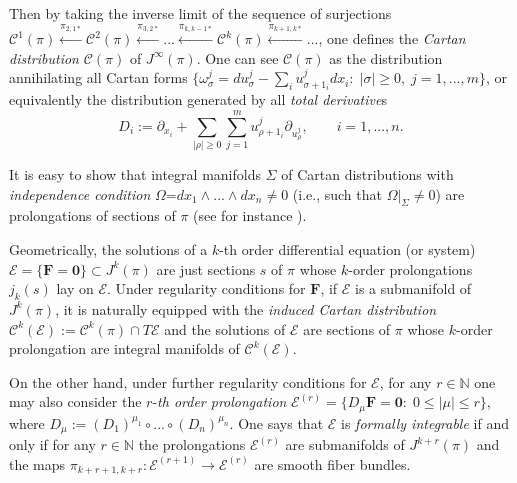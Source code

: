 \documentclass[12pt,english]{elsarticle}
\theoremstyle{plain}
\theoremstyle{plain}
\theoremstyle{remark}
\theoremstyle{plain}
\theoremstyle{definition}
\theoremstyle{definition}
\begin{document}
Then by taking the inverse limit of the sequence of surjections
$\mathcal{C}^{1}(\pi )\overset{\pi _{2,1*}}{\longleftarrow}
\mathcal{C}^{2}(\pi )\overset{\pi _{3,2*}}{\longleftarrow}...
\overset{\pi _{k,k-1*}}{\longleftarrow}\mathcal{C}^{k}(\pi )
\overset{\pi _{k+1,k*}}{\longleftarrow}...$, one defines the
\textit{Cartan distribution} $\mathcal{C}(\pi )$ of
$J^{\infty}(\pi )$. One can see $\mathcal{C}(\pi )$ as the distribution
annihilating all Cartan forms
$\{\omega _{\sigma}^{j}=du_{\sigma}^{j}-\sum _{i}u_{\sigma +1_{i}}^{j}dx_{i}:
\;|\sigma |\geq 0,\;j=1,...,m\}$, or equivalently the distribution generated
by all \textit{total derivative}s
%
\begin{equation*}
D_{i}:=\partial _{x_{i}}+{\displaystyle \sum _{|\rho |\geq 0}\sum _{j=1}^{m}u_{
\rho +1_{i}}^{j}\partial _{u_{\rho}^{j}}},\qquad i=1,...,n.
\end{equation*}

It is easy to show that integral manifolds $\Sigma $ of Cartan distributions
with \textit{independence condition}
$\text{$\Omega$=}dx_{1}\wedge ...\wedge dx_{n}\neq 0$ (i.e.,
such that $\Omega |_{\Sigma}\neq 0$) are prolongations of sections of
$\pi $ (see for instance \cite{Stormark}).

Geometrically, the solutions of a $k$-th order differential equation (or
system) $\mathcal{E}=\{\mathbf{F}=\mathbf{0}\}\subset J^{k}(\pi )$ are
just sections $s$ of $\pi $ whose $k$-order prolongations $j_{k}(s)$ lay
on $\mathcal{E}$. Under regularity conditions for $\mathbf{F}$, if
$\mathcal{E}$ is a submanifold of $J^{k}(\pi )$, it is naturally equipped
with the \textit{induced Cartan distribution}
$\mathcal{C}^{k}(\mathcal{E}):=\mathcal{C}^{k}(\pi )\cap T\mathcal{E}$
and the solutions of $\mathcal{E}$ are sections of $\pi $ whose $k$-order
prolongation are integral manifolds of
$\mathcal{C}^{k}(\mathcal{E})$.

On the other hand, under further regularity conditions for
$\mathcal{E}$, for any $r\in \mathbb{N}$ one may also consider the
$r$-\textit{th order prolongation}
$\mathcal{E}^{(r)}=\{D_{\mu}\mathbf{F}=\mathbf{0}:\;0\leq |\mu |\leq r
\}$, where
$D_{\mu}:=\left (D_{1}\right )^{\mu _{1}}\circ ...\circ \left (D_{n}
\right )^{\mu _{n}}$. One says that $\mathcal{E}$ is
\textit{formally integrable} if and only if for any $r\in \mathbb{N}$ the
prolongations $\mathcal{E}^{(r)}$ are submanifolds of
$J^{k+r}(\pi )$ and the maps
$\pi _{k+r+1,k+r}:\mathcal{E}^{(r+1)}\rightarrow \mathcal{E}^{(r)}$ are
smooth fiber bundles.
\end{document}
